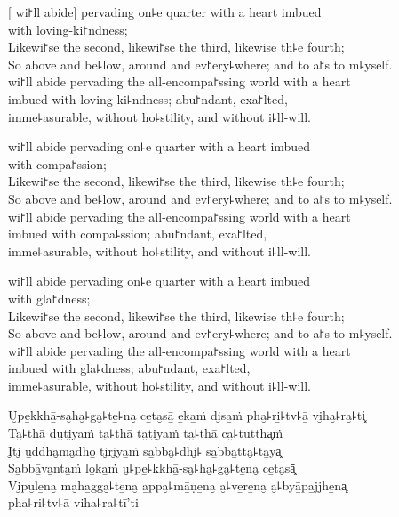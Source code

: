 [ wi꜓ll abide] pervading on꜕e quarter with a heart imbued\\
\vin with loving-ki꜓ndness;\\
Likewi꜓se the second, likewi꜓se the third, likewise th꜕e fourth;\\
So above and be꜕low, around and ev꜓ery꜕where; and to  a꜓s to m꜕yself.\\
 wi꜓ll abide pervading the all-encompa꜓ssing world with a heart \\
\vin imbued with loving-ki꜕ndness; abu꜓ndant, exa꜓lted,\\
\vin imme꜕asurable, without ho꜕stility, and without i꜕ll-will.

 wi꜓ll abide pervading on꜕e quarter with a heart imbued\\
\vin with compa꜓ssion;\\
Likewi꜓se the second, likewi꜓se the third, likewise th꜕e fourth;\\
So above and be꜕low, around and ev꜓ery꜕where; and to  a꜓s to m꜕yself.\\
 wi꜓ll abide pervading the all-encompa꜓ssing world with a heart \\
\vin imbued with compa꜕ssion; abu꜓ndant, exa꜓lted,\\
\vin imme꜕asurable, without ho꜕stility, and without i꜕ll-will.

 wi꜓ll abide pervading on꜕e quarter with a heart imbued\\
\vin with gla꜓dness;\\
Likewi꜓se the second, likewi꜓se the third, likewise th꜕e fourth;\\
So above and be꜕low, around and ev꜓ery꜕where; and to  a꜓s to m꜕yself.\\
 wi꜓ll abide pervading the all-encompa꜓ssing world with a heart \\
\vin imbued with gla꜕dness; abu꜓ndant, exa꜓lted,\\
\vin imme꜕asurable, without ho꜕stility, and without i꜕ll-will.

\clearpage

U̮pe̱kkhā̱-sa̮ha̮꜕ga̮꜕te̱꜕na̮ ce̱ta̮sā̱ e̱ka̱ṁ di̮sa̱ṁ pha̮꜕ri̱꜕tv꜕ā̱ vi̮ha̮꜕ra̮꜕ti͓\\
Ta̮꜕thā̱ du̮ti̮ya̱ṁ ta̮꜕thā̱ ta̮ti̮ya̱ṁ ta̮꜕thā̱ ca̮꜕tu̱ttha͓ṁ\\
I̮ti̮ u̱ddha̮ma̮dho̱ ti̮ri̮ya̱ṁ sa̱bba̮꜕dhi̮꜕ sa̱bba̱tta̮꜕tā̱ya͓\\
Sa̱bbā̱va̱nta̱ṁ lo̱ka̱ṁ u̮꜕pe̱꜕kkhā̱-sa̮꜕ha̮꜕ga̮꜕te̱na̮ ce̱ta̮sā͓\\
Vi̮pu̮le̱na̮ ma̮ha̱gga̮꜕te̱na̮ a̱ppa̮꜕mā̱ṇe̱na̮ a̮꜕ve̱re̱na̮ a̮꜕byā̱pa̱jjhe̱na͓\\
\vin pha꜕ri꜕tv꜕ā viha꜕ra꜕tī'ti

